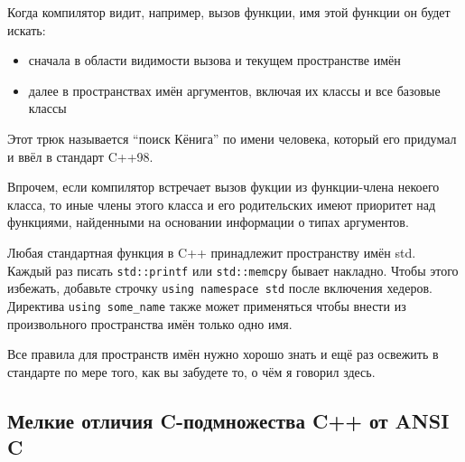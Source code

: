 \documentclass[a4paper,12pt,oneside]{article}
\begin{document}
Когда компилятор видит, например, вызов функции, имя этой функции он будет искать:
\begin{itemize}
\item
сначала в области видимости вызова и текущем пространстве имён
\item
далее в пространствах имён аргументов, включая их классы и все базовые классы
\end{itemize}

Этот трюк называется ``поиск Кёнига'' по имени человека, который его придумал и ввёл в стандарт C++98.



Впрочем, если компилятор встречает вызов фукции из функции-члена некоего класса, то иные члены этого класса и его родительских имеют приоритет над функциями, найденными на основании информации о типах аргументов.

Любая стандартная функция в C++ принадлежит пространству имён std. Каждый раз писать \lstinline!std::printf! или \lstinline!std::memcpy! бывает накладно. Чтобы этого избежать, добавьте строчку \lstinline!using namespace std! после включения хедеров. Директива \lstinline!using some_name! также может применяться чтобы внести из произвольного пространства имён только одно имя.



Все правила для пространств имён нужно хорошо знать и ещё раз освежить в стандарте по мере того, как вы забудете то, о чём я говорил здесь.

\subsection{Мелкие отличия C-подмножества C++ от ANSI C}
\end{document}
